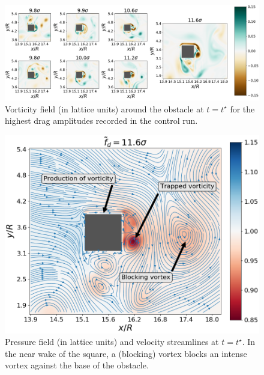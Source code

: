 \documentclass{jfm}
\begin{document}
\begin{figure}
  \centering
  \includegraphics[width=\linewidth]{illustr_extrms_vorticity/illustr_extrms_vorticity.png}
  \caption{\label{fig:top_4_events_vorticity} Vorticity field (in lattice units) around the obstacle at $t=t^{\star}$ for the highest drag amplitudes recorded in the control run.
  }
\end{figure}

\begin{figure}
  \centering
  \includegraphics[width=.5\linewidth]{illustr_density_streamlines/illustr_density_streamlines.png}
  \caption{\label{fig:density+streamlines} Pressure field (in lattice units) and velocity streamlines at $t=t^{\star}$. In the near wake of the square, a (blocking) vortex blocks an intense vortex against the base of the obstacle.}
\end{figure}
\end{document}
